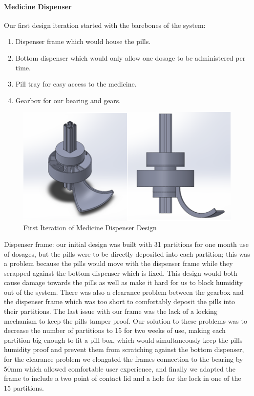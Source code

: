 \documentclass[12pt]{article}
\begin{document}
\paragraph{Medicine Dispenser}
\par Our first design iteration started with the barebones of the system:
\begin{enumerate}
\item Dispenser frame which would house the pills.
\item Bottom dispenser which would only allow one dosage to be administered per time.
\item Pill tray for easy access to the medicine.
\item Gearbox for our bearing and gears.
\end{enumerate}
\begin{figure}[H]
	\centering
	\includegraphics[width=0.75\linewidth]{M5.jpg}
	\caption{First Iteration of Medicine Dispenser Design}
\end{figure}
\par Dispenser frame: our initial design was built with 31 partitions for one month use of dosages, but the pills were to be directly deposited into each partition; this was a problem because the pills would move with the dispenser frame while they scrapped against the bottom dispenser which is fixed. This design would both cause damage towards the pills as well as make it hard for us to block humidity out of the system. There was also a clearance problem between the gearbox and the dispenser frame which was too short to comfortably deposit the pills into their partitions. The last issue with our frame was the lack of a locking mechanism to keep the pills tamper proof. Our solution to these problems was to decrease the number of partitions to 15 for two weeks of use, making each partition big enough to fit a pill box, which would simultaneously keep the pills humidity proof and prevent them from scratching against the bottom dispenser, for the clearance problem we elongated the frames connection to the bearing by 50mm which allowed comfortable user experience, and finally we adapted the frame to include a two point of contact lid and a hole for the lock in one of the 15 partitions.
\end{document}
